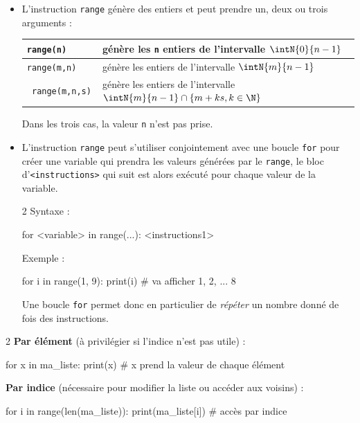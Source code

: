 \documentclass[11pt,a4paper]{article}
\begin{document}
\begin{tcolorbox}[left=0cm,title=\bf{\faPython \; Boucles {\tt for} avec {\tt range}},colbacktitle=cfond]
\begin{itemize}
	\item[\textbullet] L'instruction {\tt range} génère des entiers et peut prendre un, deux ou trois arguments :
	\begin{tabularx}{\linewidth}{|>{\tt}l|X|}
		\hline
		range(n) & génère les {\tt n} entiers de l'intervalle $\intN{0}{n-1}$ \\
		\hline
		range(m,n) & génère les entiers de l'intervalle $\intN{m}{n-1}$ \\
		\hline
		range(m,n,s) & génère les entiers de l'intervalle $\intN{m}{n-1} \cap \{m+ks, k \in \N\}$ \\
		\hline
	\end{tabularx}
	{\small \danger \;} Dans les trois cas, la valeur {\tt n} n'est pas prise.
	\item[\textbullet] L'instruction {\tt range} peut s'utiliser conjointement avec une boucle {\tt for} pour créer une variable qui prendra les valeurs générées par le {\tt range}, le bloc d'{\tt <instructions>} qui suit est alors exécuté pour chaque valeur de la variable.
	\setlength{\multicolsep}{0pt}
	\begin{multicols}{2}
		Syntaxe :
		\begin{python} 
for <variable> in range(...):
	<instructions1>
		\end{python} 
		Exemple : 
		\begin{python} 
for i in range(1, 9):
	print(i) # va afficher 1, 2, ... 8
		\end{python}
	\end{multicols}
Une boucle {\tt for} permet donc en particulier de \textit{répéter} un nombre donné de fois des instructions.
\end{itemize}
\end{tcolorbox}

\begin{tcolorbox}[left=0cm,title=\bf{\faPython \; Parcours d'une liste ou d'une chaîne},colbacktitle=cfond]
\setlength{\multicolsep}{0pt}
\begin{multicols}{2}
	\textbf{Par élément} (à privilégier si l'indice n'est pas utile) :
	\begin{python}
for x in ma_liste:
	print(x) # x prend la valeur de chaque élément
	\end{python}
	\textbf{Par indice} (nécessaire pour modifier la liste ou accéder aux voisins) :
	\begin{python}
for i in range(len(ma_liste)):
	print(ma_liste[i]) # accès par indice
	\end{python}
\end{multicols}
\end{tcolorbox}
\end{document}
